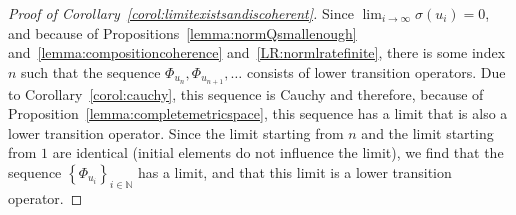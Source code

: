 \documentclass[10pt,a4paper]{paper}
\theoremstyle{definition}
\newcommand{\nats}{\mathbb{N}}
\begin{document}
\begin{proof}[Proof of Corollary~\ref{corol:limitexistsandiscoherent}]
Since $\lim_{i\to\infty}\sigma(u_i)=0$, and because of Propositions~\ref{lemma:normQsmallenough} and~\ref{lemma:compositioncoherence} and~\ref{LR:normlratefinite}, there is some index $n$ such that the sequence $\Phi_{u_n},\Phi_{u_{n+1}},\ldots$ consists of lower transition operators. Due to Corollary~\ref{corol:cauchy}, this sequence is Cauchy and therefore, because of Proposition~\ref{lemma:completemetricspace}, this sequence has a limit that is also a lower transition operator. Since the limit starting from $n$ and the limit starting from $1$ are identical (initial elements do not influence the limit), we find that the sequence $\left\{\Phi_{u_i}\right\}_{i\in\nats}$ has a limit, and that this limit is a lower transition operator.
\end{proof}
\end{document}
